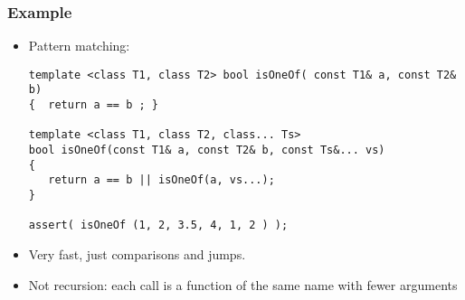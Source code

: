 

\begin{frame}[fragile,t]
\frametitle{Example}
\begin{itemize}[<+->]
\item Pattern matching:
{\scriptsize\begin{verbatim}
template <class T1, class T2> bool isOneOf( const T1& a, const T2& b)
{  return a == b ; }

template <class T1, class T2, class... Ts>
bool isOneOf(const T1& a, const T2& b, const Ts&... vs)
{
   return a == b || isOneOf(a, vs...);
}

assert( isOneOf (1, 2, 3.5, 4, 1, 2 ) );
\end{verbatim}
}
\item Very fast, just comparisons and jumps.
\item Not recursion: each call is a function of the same name with fewer arguments
\end{itemize}
\end{frame}

